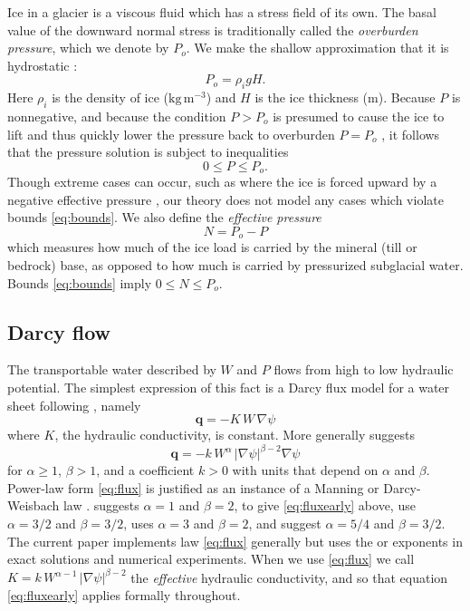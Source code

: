 \documentclass[11pt,final]{amsart}
\newcommand\bq{\mathbf{q}}
\newcommand{\grad}{\nabla}
\begin{document}
Ice in a glacier is a viscous fluid which has a stress field of its own.  The basal value of the downward normal stress is traditionally called the \emph{overburden pressure}, which we denote by $P_o$.  We make the shallow approximation that it is hydrostatic \citep{GreveBlatter2009}:
\begin{equation} \label{eq:hydrostatic}
  P_o = \rho_i g H.
\end{equation}
Here $\rho_i$ is the density of ice ($\text{kg}\,\text{m}^{-3}$) and $H$ is the ice thickness (m).  Because $P$ is nonnegative, and because the condition $P>P_o$ is presumed to cause the ice to lift and thus quickly lower the pressure back to overburden $P=P_o$ \citep{Schoofetal2012}, it follows that the pressure solution is subject to inequalities
\begin{equation}
0 \le P \le P_o. \label{eq:bounds}
\end{equation}
Though extreme cases can occur, such as where the ice is forced upward by a negative effective pressure \citep{Schoofetal2012}, our theory does not model any cases which  violate bounds \eqref{eq:bounds}.  We also define the \emph{effective pressure}
\begin{equation}
N = P_o - P  \label{eq:effective}
\end{equation}
which measures how much of the ice load is carried by the mineral (till or bedrock) base, as opposed to how much is carried by pressurized subglacial water.  Bounds \eqref{eq:bounds} imply $0 \le N \le P_o$.

\subsection*{Darcy flow}  The transportable water described by $W$ and $P$ flows from high to low hydraulic potential.  The simplest expression of this fact is a Darcy flux model for a water sheet following \cite{Clarke05}, namely
\begin{equation}  \label{eq:fluxearly}
\bq = - K \,W\, \grad \psi
\end{equation}
where $K$, the hydraulic conductivity, is constant.  More generally \cite{Schoofetal2012} suggests
\begin{equation}  \label{eq:flux}
\bq = - k\, W^\alpha\, |\grad \psi|^{\beta-2} \grad \psi
\end{equation}
for $\alpha \ge 1$, $\beta>1$, and a coefficient $k>0$ with units that depend on $\alpha$ and $\beta$.  Power-law form \eqref{eq:flux} is justified as an instance of a Manning or Darcy-Weisbach law \citep{Schoofetal2012}.  \cite{Clarke05} suggests $\alpha=1$ and $\beta=2$, to give \eqref{eq:fluxearly} above, \cite{CreytsSchoof2009} use $\alpha=3/2$ and $\beta=3/2$, \cite{Hewitt2011,Hewitt2013} uses $\alpha=3$ and $\beta = 2$, and \cite{Hewittetal2012} suggest $\alpha=5/4$ and $\beta=3/2$.  The current paper implements law \eqref{eq:flux} generally but uses the \cite{Clarke05} or \cite{Hewittetal2012} exponents in exact solutions and numerical experiments.  When we use \eqref{eq:flux} we call $K = k\, W^{\alpha-1}\, |\grad \psi|^{\beta-2}$ the \emph{effective} hydraulic conductivity, and so that equation \eqref{eq:fluxearly} applies formally throughout.
\end{document}
